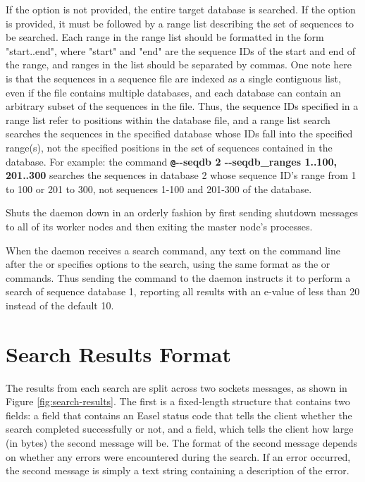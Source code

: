 \documentclass[notoc,justified]{tufte-book}    %
\begin{document}
{\begin{sreitems}{}
  If the  option is not provided, the entire target database is searched. If the  option is provided, it must be followed by a range list describing the set of sequences to be searched.  Each range in the range list should be formatted in the form "start..end", where "start" and "end" are the sequence IDs of the start and end of the range, and ranges in the list should be separated by commas. One note here is that the sequences in a sequence file are indexed as a single contiguous list, even if the file contains multiple databases, and each database can contain an arbitrary subset of the sequences in the file.  Thus, the sequence IDs specified in a range list refer to positions within the database file, and a range list search searches the sequences in the specified database whose IDs fall into the specified range(s), not the specified positions in the set of sequences contained in the database. For example: the command {\small\bfseries\texttt @-{}-seqdb 2 -{}-seqdb\_ranges 1..100, 201..300} searches the sequences in database 2 whose sequence ID's range from 1 to 100 or 201 to 300, not sequences 1-100 and 201-300 of the database.
  \item[\monob{!shutdown}] Shuts the daemon down in an orderly fashion by first sending shutdown messages to all of its worker nodes and then exiting the master node's processes.
\end{sreitems}

When the daemon receives a search command, any text on the command line after the  or  specifies options to the search, using the same format as the  or  commands.  Thus sending the command  to the daemon instructs it to perform a search of sequence database 1, reporting all results with an e-value of less than 20 instead of the default 10.


\section{Search Results Format}
The results from each search are split across two sockets messages, as shown in Figure \ref{fig:search-results}.  The first is a fixed-length  structure that contains two fields: a  field that contains an Easel status code that tells the client whether the search completed successfully or not, and a  field, which tells the client how large (in bytes) the second message will be.  The format of the second message depends on whether any errors were encountered during the search.  If an error occurred, the second message is simply a text string containing a description of the error.  


}
\end{document}

